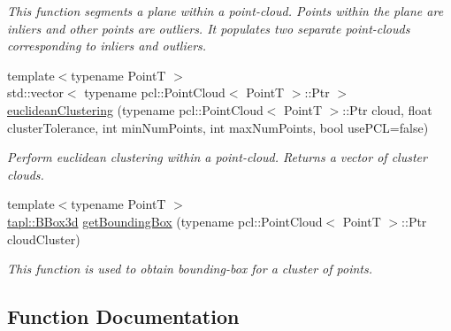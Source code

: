 \begin{DoxyCompactItemize}
\begin{DoxyCompactList}\small\item\em This function segments a plane within a point-\/cloud. Points within the plane are inliers and other points are outliers. It populates two separate point-\/clouds corresponding to inliers and outliers. \end{DoxyCompactList}\item 
{\footnotesize template$<$typename PointT $>$ }\\std\+::vector$<$ typename pcl\+::\+Point\+Cloud$<$ PointT $>$\+::Ptr $>$ \hyperlink{namespacetapl_1_1pte_a69e06eaa64248177550033adb709fb3d}{euclidean\+Clustering} (typename pcl\+::\+Point\+Cloud$<$ PointT $>$\+::Ptr cloud, float cluster\+Tolerance, int min\+Num\+Points, int max\+Num\+Points, bool use\+P\+CL=false)
\begin{DoxyCompactList}\small\item\em Perform euclidean clustering within a point-\/cloud. Returns a vector of cluster clouds. \end{DoxyCompactList}\item 
{\footnotesize template$<$typename PointT $>$ }\\\hyperlink{structtapl_1_1BBox3d}{tapl\+::\+B\+Box3d} \hyperlink{namespacetapl_1_1pte_ac4b4a53485d62466140d43448496536b}{get\+Bounding\+Box} (typename pcl\+::\+Point\+Cloud$<$ PointT $>$\+::Ptr cloud\+Cluster)
\begin{DoxyCompactList}\small\item\em This function is used to obtain bounding-\/box for a cluster of points. \end{DoxyCompactList}\end{DoxyCompactItemize}


\subsection{Function Documentation}
